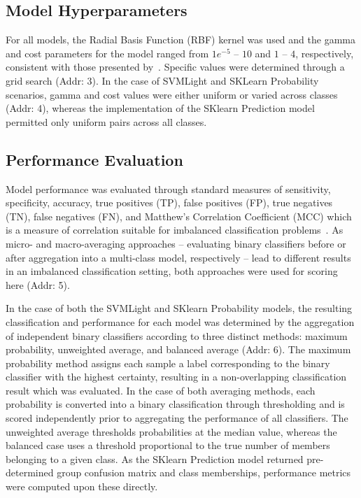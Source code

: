 \subsection{Model Hyperparameters}
For all models, the Radial Basis Function (RBF) kernel was used and the gamma and cost parameters for the model ranged
from $1e^{-5}$ -- $10$ and $1$ -- $4$, respectively, consistent with those presented by~\cite{mishra_prediction_2014}.
Specific values were determined through a grid search (Addr: 3). In the case of SVMLight and SKLearn Probability
scenarios, gamma and cost values were either uniform or varied across classes (Addr: 4), whereas the implementation of
the SKlearn Prediction model permitted only uniform pairs across all classes.

\subsection{Performance Evaluation}
Model performance was evaluated through standard measures of sensitivity, specificity, accuracy, true positives (TP),
false positives (FP), true negatives (TN), false negatives (FN), and Matthew's Correlation Coefficient (MCC) which is a
measure of correlation suitable for imbalanced classification problems~\cite{mcc2017optimal}. As micro- and
macro-averaging approaches -- evaluating binary classifiers before or after aggregation into a multi-class model,
respectively -- lead to different results in an imbalanced classification setting, both approaches were used for
scoring here (Addr: 5).

In the case of both the SVMLight and SKlearn Probability models, the resulting classification and performance for each
model was determined by the aggregation of independent binary classifiers according to three distinct methods: maximum
probability, unweighted average, and balanced average (Addr: 6). The maximum probability method assigns each sample a
label corresponding to the binary classifier with the highest certainty, resulting in a non-overlapping classification
result which was evaluated. In the case of both averaging methods, each probability is converted into a binary
classification through thresholding and is scored independently prior to aggregating the performance of all classifiers.
The unweighted average thresholds probabilities at the median value, whereas the balanced case uses a threshold
proportional to the true number of members belonging to a given class. As the SKlearn Prediction model returned
pre-determined group confusion matrix and class memberships, performance metrics were computed upon these directly.

